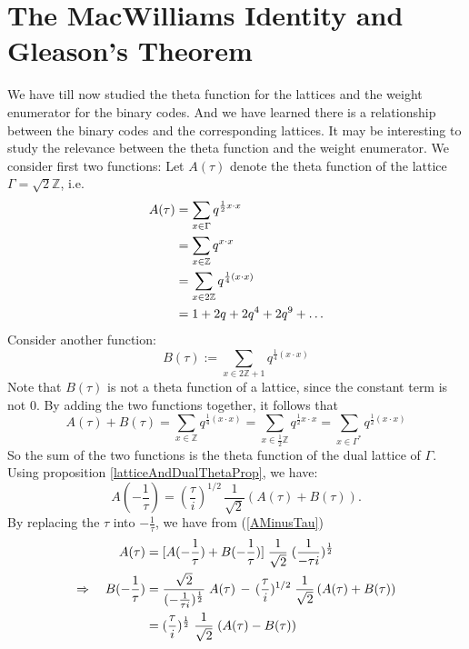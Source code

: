 \documentclass[12pt]{article}
\theoremstyle{definition}
\numberwithin{equation}{theorem}
\numberwithin{figure}{theorem}
\newcommand{\Integer}{\ensuremath{\mathbb{Z}}}
\newcommand{\imaginary}{\ensuremath{i}}
\begin{document}
\section{The MacWilliams Identity and Gleason's Theorem}\label{sectionMacWill}
We have till now studied the theta function for the lattices and the weight enumerator for the binary codes. And we have learned there is a relationship between the binary codes and the corresponding lattices. It may be interesting to study the relevance between the theta function and the weight enumerator.
We consider first two functions:
Let $A(\tau)$ denote the theta function of the lattice $\Gamma = \sqrt{2}\Integer$, i.e.
	\begin{align}
	A(\tau) &= \sum_{x \in \Gamma}q^{\frac{1}{2}x\cdot x} \notag\\
			&= \sum_{x \in \Integer}q^{x\cdot x} \notag\\
			&= \sum_{x \in 2\Integer}q^{\frac{1}{4}(x\cdot x)}\label{Afunc}\\
			&= 1 + 2q + 2q^4 + 2q^9 + \ldots \notag
	\end{align}
Consider another function:
\begin{equation}\label{Bfunc}
	B(\tau) := \sum_{x \in 2\Integer + 1}q^{\frac{1}{4}(x\cdot x)}
\end{equation}
Note that $B(\tau)$ is not a theta function of a lattice, since the constant term is not 0.
By adding the two functions together, it follows that
\begin{equation}\label{sumABfuncEq}
	A(\tau) + B(\tau) = \sum_{x \in \Integer}q^{\frac{1}{4}(x\cdot x)} = \sum_{x \in \frac{1}{2}\Integer}q^{\frac{1}{2}x \cdot x}
			= \sum_{x\in \Gamma^{*}}q^{\frac{1}{2}(x\cdot x)}
\end{equation}
So the sum of the two functions is the theta function of the dual lattice of $\Gamma$. Using proposition \ref{latticeAndDualThetaProp}, we have:
\begin{equation}\label{AMinusTau}
	A(-\frac{1}{\tau}) = (\frac{\tau}{\imaginary})^{1/2} \, \frac{1}{\sqrt{2}}(A(\tau) + B(\tau)).
\end{equation}
By replacing the $\tau$ into $-\frac{1}{\tau}$, we have from (\ref{AMinusTau})
\begin{align}
	A(\tau)&= [A(-\frac{1}{\tau}) + B(-\frac{1}{\tau})]\; \frac{1}{\sqrt{2}}\; (\frac{1}{-\tau \imaginary})^{\frac{1}{2}}  \notag \\
	\Rightarrow \quad B(-\frac{1}{\tau}) &= \frac{\sqrt{2}}{(-\frac{1}{\tau \imaginary})^{\frac{1}{2}}} \; A(\tau) \,- \,(\frac{\tau}{\imaginary})^{1/2} \; \frac{1}{\sqrt{2}}\,(A(\tau) + B(\tau))\notag\\
	&= (\frac{\tau}{\imaginary})^{\frac{1}{2}} \;\frac{1}{\sqrt{2}}\;(A(\tau) - B(\tau)) \label{BMinusTau}
\end{align}
\end{document}
